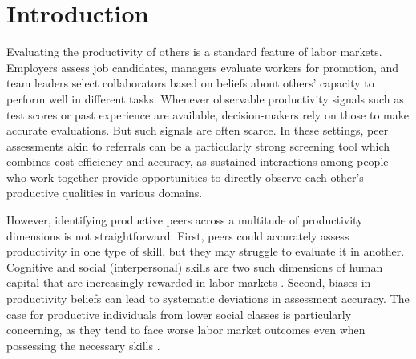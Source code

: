 \documentclass[11pt,a4paper,oneside]{article}
\begin{document}

\section{Introduction}
Evaluating the productivity of others is a standard feature of labor markets. Employers assess job candidates, managers evaluate workers for promotion, and team leaders select collaborators based on beliefs about others' capacity to perform well in different tasks. Whenever observable productivity signals such as test scores or past experience are available, decision-makers rely on those to make accurate evaluations. But such signals are often scarce. In these settings, peer assessments akin to referrals can be a particularly strong screening tool which combines cost-efficiency and accuracy, as sustained interactions among people who work together provide opportunities to directly observe each other's productive qualities in various domains.

However, identifying productive peers across a multitude of productivity dimensions is not straightforward. First, peers could accurately assess productivity in one type of skill, but they may struggle to evaluate it in another. Cognitive and social (interpersonal) skills are two such dimensions of human capital that are increasingly rewarded in labor markets \citep{deming2017growing,deming2023multidimensional}. Second, biases in productivity beliefs can lead to systematic deviations in assessment accuracy. The case for productive individuals from lower social classes is particularly concerning, as they tend to face worse labor market outcomes even when possessing the necessary skills \citep{stansbury2024class}.
 
\end{document}
